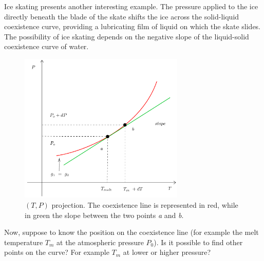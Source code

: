 \documentclass[../../Main/Main.tex]{subfiles}
\begin{document}
\begin{remark}
Ice skating presents another interesting example. The pressure applied to the ice directly beneath the blade of the skate shifts the ice across the solid-liquid coexistence curve, providing a lubricating film of liquid on which the skate slides. The possibility of ice skating depends on the negative slope of the liquid-solid coexistence curve of water.
\end{remark}
\begin{figure}[h!]
\centering
\includegraphics[width=0.7\textwidth]{./img/2__2.pdf}
\caption{\label{fig:3_1} \( (T,P) \) projection. The coexistence line is represented in red, while in green the slope between the two points \emph{a} and \emph{b}.}
\end{figure}

Now, suppose to know the position on the coexistence line (for example the melt temperature \( T_m \) at the atmospheric pressure \( P_0 \)). Is it possible to find other points on the curve? For example \( T_m \) at lower or higher pressure?
\end{document}
